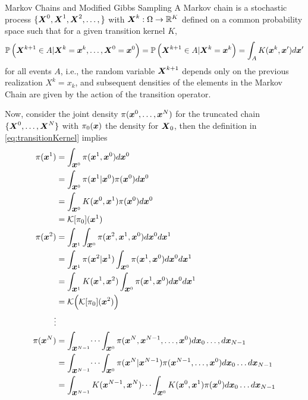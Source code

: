 \begin{chapter}{Markov Chains and Modified Gibbs Sampling}
A Markov chain is a stochastic process $\{\mbox{\boldmath$X$}^0, \mbox{\boldmath$X$}^1,\mbox{\boldmath$X$}^2,\dots,\}$ with $\mbox{\boldmath$X$}^k:\Omega \to \mathbb R^K$ defined on a common probability space such that for a given transition kernel $K$,
\begin{equation}
  \mathbb P\left( \mbox{\boldmath$X$}^{k+1} \in A | \mbox{\boldmath$X$}^k= \mbox{\boldmath$x$}^k,\dots,\mbox{\boldmath$X$}^0=\mbox{\boldmath$x$}^0\right) 
    = \mathbb P\left( \mbox{\boldmath$X$}^{k+1} \in A | \mbox{\boldmath$X$}^k= \mbox{\boldmath$x$}^k\right) 
    = \int_A K(\mbox{\boldmath$x$}^k,\mbox{\boldmath$x$}') d\mbox{\boldmath$x$}'
\end{equation}
for all events $A$, i.e., the random variable $\mbox{\boldmath$X$}^{k+1}$ depends only on the previous realization $X^k=x_k$, and subsequent densities of the elements in the Markov Chain are given by the action of the transition operator.

Now, consider the joint density $\pi(\mbox{\boldmath$x$}^0,\dots,\mbox{\boldmath$x$}^N)$ for the truncated chain $\{\mbox{\boldmath$X$}^0,\dots,\mbox{\boldmath$X$}^N\}$ with $\pi_0(\mbox{\boldmath$x$})$ the density for $\mbox{\boldmath$X$}_0$, then the definition in \eqref{eq:transitionKernel} implies
\begin{align} 
  \pi(\vect x^1) 
    &= \int_{\vect x^0} \pi(\vect x^1,\vect x^0) d\vect x^0 \nonumber\\
    &= \int_{\vect x^0} \pi(\vect x^1|\vect x^0)\pi( \vect x^0) d\vect x^0 \nonumber\\
    &= \int_{\vect x^0} K(\vect x^0,\vect x^1)\pi( \vect x^0) d\vect x^0\nonumber\\
    &= \K [\pi_0](\vect x^1) \\
  \pi(\vect x^2) 
    &= \int_{\vect x^1}\int_{\vect x^0} \pi(\vect x^2,\vect x^1,\vect x^0) d\vect x^0 d\vect x^1\nonumber\\
    &= \int_{\vect x^1}\pi(\vect x^2|\vect x^1)\int_{\vect x^0} \pi(\vect x^1,\vect x^0) d\vect x^0 d\vect x^1\nonumber\\
    &= \int_{\vect x^1}K(\vect x^1,\vect x^2)\int_{\vect x^0} \pi(\vect x^1,\vect x^0) d\vect x^0 d\vect x^1\nonumber\\
    &= \K \Big( \K [\pi_0](\vect x^2)\Big)\\
    \vdots\nonumber\\
  \pi(\vect x^N)  
    &= \int_{\vect x^{N-1}}\dots\int_{\vect x^0} \pi(\vect x^N, \vect x^{N-1},\dots,\vect x^0)d\vect x_0\dots,d\vect x_{N-1}\nonumber\\
    &= \int_{\vect x^{N-1}}\dots\int_{\vect x^0} \pi(\vect x^N| \vect x^{N-1})\pi(\vect x^{N-1},\dots,\vect x^0)d\vect x_0\dots d\vect x_{N-1} \nonumber\\
    &= \int_{\vect x^{N-1}}K( \vect x^{N-1},\vect x^N)\dots\int_{\vect x^0} K(\vect x^0,\vect x^1)\pi(\vect x^0)d\vect x_0\dots d\vect x_{N-1} \nonumber\\

\end{align}
\end{chapter}
